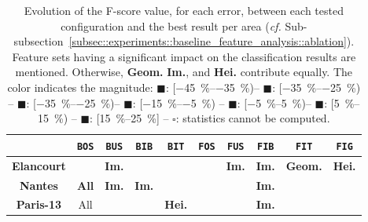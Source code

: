         \begin{table}[htbp]
            \footnotesize 
            \centering
            \renewcommand{\arraystretch}{1.5}
            \begin{tabular}{| c | c c c c |c c c c c|}
                \hline
                & \texttt{BOS} & \texttt{BUS}&\texttt{BIB}&\texttt{BIT}&\texttt{FOS} & \texttt{FUS}&\texttt{FIB}&\texttt{FIT}&\texttt{FIG}\\
                \hline
                \textbf{Elancourt} & \cellcolor{LOSS1525}& \cellcolor{LOSS1525}\textbf{Im.}& \cellcolor{LOSS1525}&\cellcolor{LOSS1525} &\cellcolor{STBL} &\cellcolor{GAIN0515}\textbf{Im.} &\cellcolor{GAIN1525}\textbf{Im.} &\cellcolor{LOSS0515}\textbf{Geom.} & \cellcolor{LOSS0515} \textbf{Hei.}\\
                \textbf{Nantes} & \cellcolor{STBL}\textbf{All}& \cellcolor{LOSS1525}\textbf{Im.}&\cellcolor{LOSS0515}\textbf{Im.} &\cellcolor{GAIN1525} &\cellcolor{STBL} & \cellcolor{STBL}& \cellcolor{LOSS1525}\textbf{Im.}& &\cellcolor{STBL}\\
                \textbf{Paris-13} &\cellcolor{LOSS1525}All &\cellcolor{LOSS1525} & &\cellcolor{GAIN0515}\textbf{Hei.} &\cellcolor{STBL} &\cellcolor{LOSS3545} &\cellcolor{LOSS1525}\textbf{Im.} & &\cellcolor{LOSS0515}\\
                \hline
            \end{tabular}
            \renewcommand{\arraystretch}{1}
            \caption{
                \label{tab::generalization_comparison} Evolution of the F-score value, for each error, between each tested configuration and the best result per area (\textit{cf.} Sub-subsection~\ref{subsec::experiments::baseline_feature_analysis::ablation}).
                Feature sets having a significant impact on the classification results are mentioned.
                Otherwise, \textbf{Geom.} \textbf{Im.}, and \textbf{Hei.} contribute equally.
                The color indicates the magnitude: \textcolor{LOSS3545}{$\blacksquare$}: [\SIrange[range-phrase={,  }]{-45}{-35}{\percent})--
                \textcolor{LOSS2535}{$\blacksquare$}: [\SIrange[range-phrase={, }]{-35}{-25}{\percent}) --
                \textcolor{LOSS1525}{$\blacksquare$}: [\SIrange[range-phrase={, }]{-35}{-25}{\percent})--
                \textcolor{LOSS0515}{$\blacksquare$}: [\SIrange[range-phrase={, }]{-15}{-5}{\percent}) --
                \textcolor{STBL}{$\blacksquare$}: [\SIrange[range-phrase={, }]{-5}{5}{\percent})--
                \textcolor{GAIN0515}{$\blacksquare$}: [\SIrange[range-phrase={, }]{5}{15}{\percent}) --
                \textcolor{GAIN1525}{$\blacksquare$}: [\SIrange[range-phrase={, }]{15}{25}{\percent}] --
                $\square$: statistics cannot be computed.
            }
        \end{table}
            
